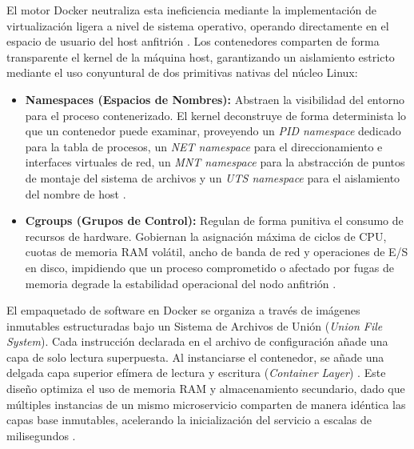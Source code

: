 \documentclass[12pt,journal,onecolumn]{IEEEtran}
\begin{document}
El motor Docker neutraliza esta ineficiencia mediante la implementación de virtualización ligera a nivel de sistema operativo, operando directamente en el espacio de usuario del host anfitrión \cite{sultan2019}. Los contenedores comparten de forma transparente el kernel de la máquina host, garantizando un aislamiento estricto mediante el uso conyuntural de dos primitivas nativas del núcleo Linux:
\begin{itemize}
    \item \textbf{Namespaces (Espacios de Nombres):} Abstraen la visibilidad del entorno para el proceso contenerizado. El kernel deconstruye de forma determinista lo que un contenedor puede examinar, proveyendo un \textit{PID namespace} dedicado para la tabla de procesos, un \textit{NET namespace} para el direccionamiento e interfaces virtuales de red, un \textit{MNT namespace} para la abstracción de puntos de montaje del sistema de archivos y un \textit{UTS namespace} para el aislamiento del nombre de host \cite{sultan2019}.
    \item \textbf{Cgroups (Grupos de Control):} Regulan de forma punitiva el consumo de recursos de hardware. Gobiernan la asignación máxima de ciclos de CPU, cuotas de memoria RAM volátil, ancho de banda de red y operaciones de E/S en disco, impidiendo que un proceso comprometido o afectado por fugas de memoria degrade la estabilidad operacional del nodo anfitrión \cite{sultan2019}.
\end{itemize}

El empaquetado de software en Docker se organiza a través de imágenes inmutables estructuradas bajo un Sistema de Archivos de Unión (\textit{Union File System}). Cada instrucción declarada en el archivo de configuración añade una capa de solo lectura superpuesta. Al instanciarse el contenedor, se añade una delgada capa superior efímera de lectura y escritura (\textit{Container Layer}) \cite{sultan2019}. Este diseño optimiza el uso de memoria RAM y almacenamiento secundario, dado que múltiples instancias de un mismo microservicio comparten de manera idéntica las capas base inmutables, acelerando la inicialización del servicio a escalas de milisegundos \cite{burns2025, sultan2019}.
\end{document}
